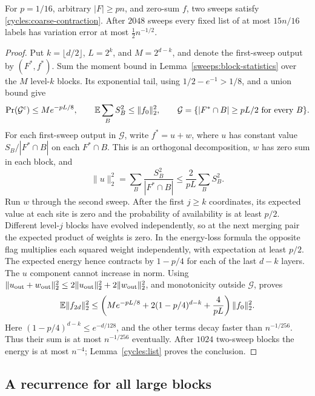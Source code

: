 \begin{proposition}
\label{cycles:centered-prop}
For $p=1/16$, arbitrary $|F|\ge pn$, and zero-sum $f$, two sweeps
satisfy \eqref{cycles:coarse-contraction}. After $2048$ sweeps every
fixed list of at most $15n/16$ labels has variation error at most
$\frac12 n^{-1/2}$.
\end{proposition}
\begin{proof}
Put $k=\lfloor d/2\rfloor$, $L=2^k$, and $M=2^{d-k}$, and denote
the first-sweep output by $(F^*,f^*)$. Sum the moment bound in
Lemma~\ref{sweeps:block-statistics} over the $M$ level-$k$ blocks.
Its exponential tail, using $1/2-e^{-1}>1/8$, and a union bound give
\begin{equation}\label{cycles:transverse}
 \Pr(\mathcal G^c)\le M e^{-pL/8},\qquad
 \mathbb E\sum_B S_B^2\le\|f_0\|_2^2,\qquad
 \mathcal G=\{|F^*\cap B|\ge pL/2\text{ for every }B\}.
\end{equation}
For each first-sweep output in $\mathcal G$, write $f^*=u+w$, where
$u$ has constant value $S_B/|F^*\cap B|$ on each $F^*\cap B$.
This is an orthogonal decomposition, $w$ has zero sum in each block, and
\[
 \|u\|_2^2=\sum_B\frac{S_B^2}{|F^*\cap B|}
       \le\frac{2}{pL}\sum_BS_B^2.
\]
Run $w$ through the second sweep. After the first $j\ge k$ coordinates,
its expected value at each site is zero and the probability of availability is at
least $p/2$. Different level-$j$ blocks have evolved independently, so
at the next merging pair the expected product of weights is zero.
In the energy-loss formula the opposite flag multiplies each squared
weight independently, with expectation at least $p/2$. The expected
energy hence contracts by $1-p/4$ for each of the last $d-k$ layers.
The $u$ component cannot increase in norm. Using
$\|u_{\rm out}+w_{\rm out}\|_2^2\le2\|u_{\rm out}\|_2^2+
2\|w_{\rm out}\|_2^2$, and monotonicity outside $\mathcal G$, proves
\begin{equation}\label{cycles:centered-factor}
 \mathbb E\|f_{2d}\|_2^2\le
 \left(Me^{-pL/8}+2(1-p/4)^{d-k}+\frac4{pL}\right)\|f_0\|_2^2.
\end{equation}
Here $(1-p/4)^{d-k}\le e^{-d/128}$, and the other terms decay faster
than $n^{-1/256}$. Thus their sum is at most $n^{-1/256}$ eventually.
After $1024$ two-sweep blocks the energy is at most $n^{-4}$;
Lemma~\ref{cycles:list} proves the conclusion.
\end{proof}

\subsection{A recurrence for all large blocks}
\label{cycles:merge}

